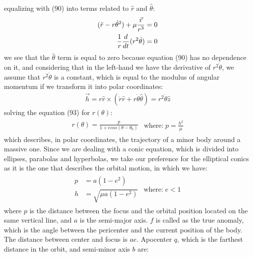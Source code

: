 \documentclass[12pt,a4paper]{article}
\begin{document}
equalizing with (90) into terms related to $\hat{r}$ and $\hat{\theta}$:
\begin{align}
    (\Ddot{r}-r\dot{\theta}^2)+\mu\frac{\Vec{r}}{r^3}&=0 \\
    \frac{1}{r}\frac{d}{dt}(r^2\dot{\theta})&=0
\end{align}
we see that the $\hat{\theta}$ term is equal to zero because equation (90) has no dependence on it, and considering that in the left-hand we have the derivative of $r^2\dot{\theta}$, we assume that $r^2\dot{\theta}$ is a constant, which is equal to the modulus of angular momentum if we transform it into polar coordinates:
\begin{align}
    \Vec{h}=r\hat{r}\times(\dot{r}\hat{r}+r\dot{\theta}\hat{\theta})=r^2\dot{\theta}\hat{z}
\end{align}
solving the equation (93) for $r(\theta)$:
\begin{align}
\begin{split}
    r(\theta)=\frac{p}{1+ecos(\theta-\theta_0)} 
\end{split}
\begin{split}
    \textrm{where:} \;  p=\frac{h^2}{\mu}
\end{split}
\end{align}
which describes, in polar coordinates, the trajectory of a minor body around a massive one. Since we are dealing with a conic equation, which is divided into ellipses, parabolas and hyperbolas, we take our preference for the elliptical conics as it is the one that describes the orbital motion, in which we have:
\begin{align}
\begin{split}
    p&=a(1-e^2)  \\
    h&=\sqrt{\mu a(1-e^2)}
\end{split}
\begin{split}
    \textrm{where:} \;  e<1
\end{split}
\end{align}
where $p$ is the distance between the focus and the orbital position located on the same vertical line, and $a$ is the semi-major axis. $f$ is called as the true anomaly, which is the angle between the pericenter and the current position of the body. The distance between center and focus is $ae$. Apocenter $q$, which is the farthest distance in the orbit, and semi-minor axis $b$ are:
\end{document}
